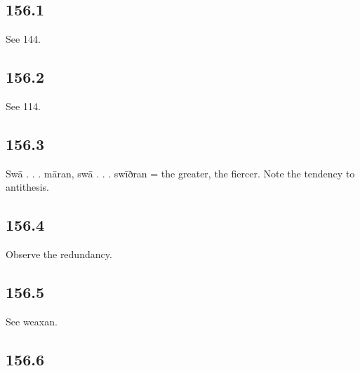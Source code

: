 \par\endgroup

\subsection*{156.1}

See 144.

\subsection*{156.2}

See 114.

\subsection*{156.3}

Swā . . . māran, swā . . . swīðran = the greater, the fiercer. Note the tendency to antithesis.

\subsection*{156.4}

Observe the redundancy.

\subsection*{156.5}

See weaxan.

\subsection*{156.6}

